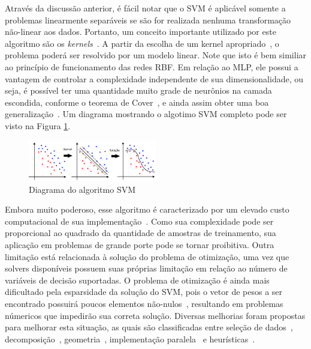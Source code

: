 \documentclass[conference]{IEEEtran}
\begin{document}
	Através da discussão anterior, é fácil notar que o SVM é aplicável somente a problemas linearmente separáveis se são for realizada nenhuma transformação não-linear aos dados. Portanto, um conceito importante utilizado por este algoritmo são os \textit{kernels}~\cite{shawetaylor2004kernel}. A partir da escolha de um kernel apropriado~\cite{mercer1909xvi,courant89}, o problema poderá ser resolvido por um modelo linear. Note que isto é bem similiar ao princípio de funcionamento das redes RBF. Em relação ao MLP, ele possui a vantagem de controlar a complexidade independente de sua dimensionalidade, ou seja, é possível ter uma quantidade muito grade de neurônios na camada escondida, conforme o teorema de Cover~\cite{cover1965geometrical}, e ainda assim obter uma boa generalização~\cite{scholkopf2018learning}. 	Um diagrama mostrando o algotimo SVM completo pode ser visto na Figura \ref{fig:svm-completo}.
	
	\begin{figure}[thpbh]
		\centering
		\includegraphics[width=0.5\textwidth]{svm-completo.png}
		\caption{Diagrama do algoritmo SVM}
		\label{fig:svm-completo}
	\end{figure}
	
 	Embora muito poderoso, esse algoritmo é caracterizado por um elevado custo computacional de sua implementação~\cite{bottou2007support}. Como sua complexidade pode ser proporcional ao quadrado da quantidade de amostras de treinamento, sua aplicação em problemas de grande porte pode se tornar proibitiva. Outra limitação está relacionada à solução do problema de otimização, uma vez que solvers disponíveis possuem suas próprias limitação em relação ao número de variáveis de decisão suportadas. O problema de otimização é ainda mais dificultado pela esparsidade da solução do SVM, pois o vetor de pesos a ser encontrado possuirá poucos elementos não-nulos~\cite{haykin2007neural}, resultando em problemas númericos que impedirão sua correta solução. Diversas melhorias foram propostas para melhorar esta situação, as quais são classificadas entre seleção de dados~\cite{wang2005training}, decomposição~\cite{dong2005fast}, geometria~\cite{zeng2008geometric}, implementação paralela~\cite{graf2004parallel} e heurísticas~\cite{decoste2000alpha}.
 	
\end{document}
